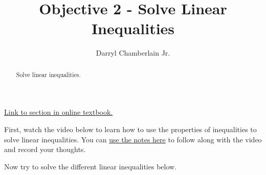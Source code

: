\documentclass{ximera}
\author{Darryl Chamberlain Jr.}
\title{Objective 2 - Solve Linear Inequalities}
\begin{document}
\begin{abstract}
Solve linear inequalities. 
\end{abstract}
\maketitle

\href{https://cnx.org/contents/mwjClAV_@8.1:uIjtHMfW@9/Linear-Inequalities-and-Absolute-Value-Inequalities}{Link to section in online textbook.}


First, watch the video below to learn how to use the properties of inequalities to solve linear inequalities. You can \href{http://people.clas.ufl.edu/dchamberlain31/files/M3-Objective-2-Solve-Linear-Inequalities-1.pdf}{use the notes here} to follow along with the video and record your thoughts.


Now try to solve the different linear inequalities below. 
\end{document}
